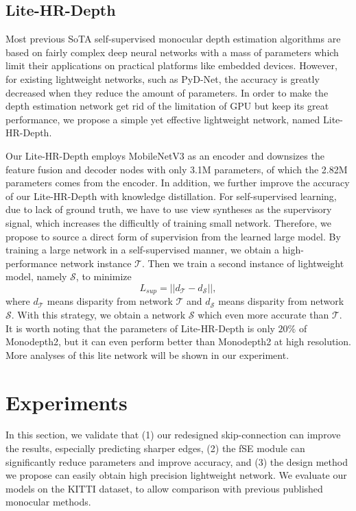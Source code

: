 \documentclass[letterpaper]{article} \usepackage{aaai21}  \usepackage{times}  \usepackage{helvet} \usepackage{courier}  \usepackage[hyphens]{url}  \usepackage{graphicx} \urlstyle{rm} \def\UrlFont{\rm}  \usepackage{natbib}  \usepackage{caption} \frenchspacing  \setlength{\pdfpagewidth}{8.5in}  \setlength{\pdfpageheight}{11in}  \usepackage{booktabs}
\begin{document}
\subsection{Lite-HR-Depth}
Most previous SoTA self-supervised monocular depth estimation algorithms are based on fairly complex deep neural networks with a mass of parameters which limit their
applications on practical platforms like embedded devices. However, for existing lightweight networks, such as PyD-Net\cite{poggi2018towards}, the accuracy is greatly decreased when they reduce the 
amount of parameters. In order to make the depth estimation network get rid of the limitation of GPU but keep its great performance, we propose a simple yet effective lightweight network, named Lite-HR-Depth. 

Our Lite-HR-Depth employs MobileNetV3 as an encoder and downsizes the feature fusion and decoder nodes with only 3.1M parameters, of which the 2.82M parameters comes from the encoder. In addition, we further
improve the accuracy of our Lite-HR-Depth with knowledge distillation\cite{hinton2015distilling}. For self-supervised learning, due to lack of ground truth, we have to use view syntheses as the supervisory signal, which increases
the difficultly of training small network. Therefore, we propose to source a direct form of supervision from the learned large model.
By training a large network in a self-supervised manner, we obtain a high-performance network instance $\mathcal{T}$. Then we train a second instance of lightweight model, namely $\mathcal{S}$, to minimize 
\begin{equation}
    L_{sup} = ||d_{\mathcal{T}} - d_{\mathcal{S}}||,
\end{equation}
where $d_{\mathcal{T}}$ means disparity from network $\mathcal{T}$ and $d_{\mathcal{S}}$ means disparity from network $\mathcal{S}$. With this strategy, we obtain a network $\mathcal{S}$ 
which even more accurate than $\mathcal{T}$. It is worth noting that the parameters of Lite-HR-Depth is only $20\%$ of Monodepth2, but it can even perform better than Monodepth2 
at high resolution. More analyses of this lite network will be shown in our experiment.

\section{Experiments}
In this section, we validate that (1) our redesigned skip-connection can improve the results, especially predicting sharper edges, (2) the fSE module can significantly reduce parameters and improve accuracy, and
(3) the design method we propose can easily obtain high precision lightweight network. We evaluate our models on the KITTI dataset\cite{geiger2013vision}, to allow comparison with previous published monocular methods.
\end{document}
